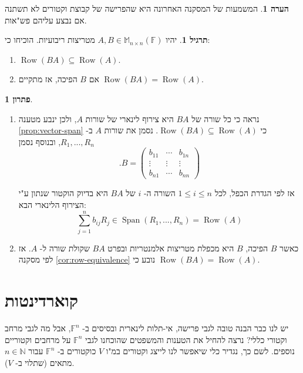 \documentclass[12pt]{report}
\theoremstyle{plain}
\theoremstyle{definition}
\newtheorem{exercise}{תרגיל}[chapter]
\newtheorem{remark}{הערה}[chapter]
\newtheorem*{solution}{פתרון}
\newcommand{\N}{\mathbb{N}}
\newcommand{\F}{\mathbb{F}}
\newcommand{\M}{\mathbb{M}}
\newcommand{\0}{\mathbf{0}}
\DeclareMathOperator{\Span}{Span}
\DeclareMathOperator{\Row}{Row}
\begin{document}
\begin{remark}
המשמעות של המסקנה האחרונה היא שהפרישה של קבוצת וקטורים לא תשתנה אם נבצע עליהם פש"אות.
\end{remark}

\begin{exercise}
יהיו
$A,B\in\M_{n\times n}(\F)$
מטריצות ריבועיות. הוכיחו כי:

\begin{enumerate}[label=\alph*.]
\item 
$\Row(BA)\subseteq\Row(A)$.


\item 
אם 
$B$
הפיכה, אז מתקיים
$\Row(BA)=\Row(A)$.


\end{enumerate}
\end{exercise}

\begin{solution}\
\begin{enumerate}[label=\alph*.]
\item 
נראה כי כל שורה של
$BA$
היא צירוף לינארי של שורות
$A$,
ולכן ינבע מטענה
\ref{prop:vector-span}
כי
$\Row(BA)\subseteq \Row(A)$.
נסמן את שורות 
$A$
ב-
$R_1,...,R_n$,
ובנוסף נסמן
$$
.B=\begin{pmatrix}
b_{11} &\cdots &b_{1n} \\
\vdots &\vdots &\vdots \\
b_{n1} &\cdots &b_{nn}
\end{pmatrix}
$$

אז לפי הגדרת הכפל, לכל 
$1\leq i\leq n$
השורה ה-
$i$
של
$BA$
היא בדיוק הוקטור שנתון ע"י הצירוף הלינארי הבא:
$$
\sum_{j=1}^n b_{ij}R_j\in\Span(R_1,...,R_n)=\Row(A)
$$


\item 
כאשר
$B$
הפיכה,
$B$
היא מכפלת מטריצות אלמנטריות ובפרט
$BA$
שקולת שורה ל-
$A$.
אז לפי מסקנה
\ref{cor:row-equivalence}
נובע כי
$\Row(BA)=\Row(A)$.


\end{enumerate}
\end{solution}

\section{קוארדינטות}

יש לנו כבר הבנה טובה לגבי פרישה, אי-תלות לינארית ובסיסים ב-
$\F^n$,
אבל מה לגבי מרחב וקטורי כללי? נרצה להחיל את הטענות והמשפטים שהוכחנו לגבי
$\F^n$
על מרחבים וקטוריים נוספים. לשם כך, נגדיר כלי שיאפשר לנו לייצג וקטורים במ"ו 
$V$
כוקטורים ב-
$\F^n$
עבור
$n\in\N$
מתאים (שתלוי ב-
$V$).
\end{document}
